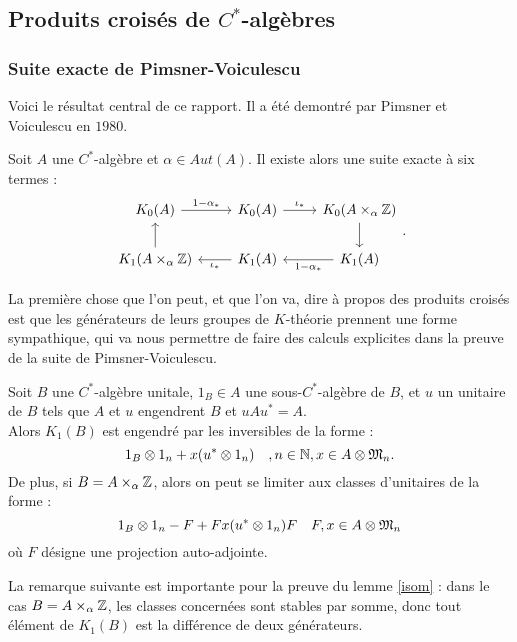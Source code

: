 \subsection{Produits croisés de $C^*$-algèbres}

\subsubsection{Suite exacte de Pimsner-Voiculescu}

Voici le résultat central de ce rapport. Il a été demontré par Pimsner et Voiculescu en $1980$.~\cite{PV}
\begin{thm}\label{PV}
Soit $A$ une $C^*$-algèbre et $\alpha \in Aut(A)$. Il existe alors une suite exacte à six termes :\\
\[\begin{tikzcd}
 K_0(A) \arrow{r}{1-\alpha_*} & K_0(A)  \arrow{r}{\iota_*}  &    K_0(A\times_\alpha \Z)  \arrow{d}  \\
 K_1(A\times_\alpha \Z) \arrow{u} & K_1(A)  \arrow{l}{\iota_*} &    K_1(A) \arrow{l}{1-\alpha_*} 
\end{tikzcd}.\]
\end{thm}

La première chose que l'on peut, et que l'on va, dire à propos des produits croisés est que les générateurs de leurs groupes de $K$-théorie prennent une forme sympathique, qui va nous permettre de faire des calculs explicites dans la preuve de la suite de Pimsner-Voiculescu.\\

\begin{lem}\label{generateur}
Soit $B$ une $C^*$-algèbre unitale, $1_B\in A$ une sous-$C^*$-algèbre de $B$, et $u$ un unitaire de $B$ tels que $A$ et $u$ engendrent $B$ et $uAu^*=A$.\\
Alors $K_1(B)$ est engendré par les inversibles de la forme :
\[1_B\otimes 1_n +x(u^*\otimes 1_n)\quad , n\in\mathbb N,  x\in A\otimes \frak M_n.\]
De plus, si $B=A\times_\alpha \mathbb Z$, alors on peut se limiter aux classes d'unitaires de la forme :
\[1_B\otimes 1_n-F+Fx(u^*\otimes 1_n)F\quad F,x\in A\otimes\frak M_n\]
où $F$ désigne une projection auto-adjointe. 
\end{lem}

La remarque suivante est importante pour la preuve du lemme \ref{isom} : dans le cas $B=A\times_\alpha \mathbb Z$, les classes concernées sont stables par somme, donc tout élément de $K_1(B)$ est la différence de deux générateurs.\\

